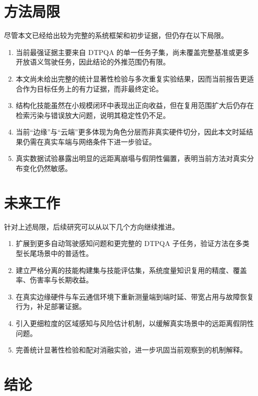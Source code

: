 \section{方法局限}
\label{sec:limitations}

尽管本文已经给出较为完整的系统框架和初步证据，但仍存在以下局限。

\begin{enumerate}
  \item 当前最强证据主要来自 DTPQA 的单一任务子集，尚未覆盖完整基准或更多开放语义驾驶任务，因此结论的外推范围仍有限。
  \item 本文尚未给出完整的统计显著性检验与多次重复实验结果，因而当前报告更适合作为目标任务上的有力证据，而非最终定论。
  \item 结构化技能虽然在小规模闭环中表现出正向收益，但在复用范围扩大后仍存在检索污染与错误放大问题，说明其稳定性仍不足。
  \item 当前“边缘”与“云端”更多体现为角色分层而非真实硬件切分，因此本文时延结果仍需在真实车端与网络条件下进一步验证。
  \item 真实数据试验暴露出明显的远距离崩塌与假阴性偏置，表明当前方法对真实分布变化仍然敏感。
\end{enumerate}

\section{未来工作}
\label{sec:future}

针对上述局限，后续研究可以从以下几个方向继续推进。

\begin{enumerate}
  \item 扩展到更多自动驾驶感知问题和更完整的 DTPQA 子任务，验证方法在多类型长尾场景中的普适性。
  \item 建立严格分离的技能构建集与技能评估集，系统度量知识复用的精度、覆盖率、伤害率与长期收益。
  \item 在真实边缘硬件与车云通信环境下重新测量端到端时延、带宽占用与故障恢复行为，补足部署证据。
  \item 引入更细粒度的区域感知与风险估计机制，以缓解真实场景中的远距离假阴性问题。
  \item 完善统计显著性检验和配对消融实验，进一步巩固当前观察到的机制解释。
\end{enumerate}

\section{结论}
\label{sec:conclusion}

